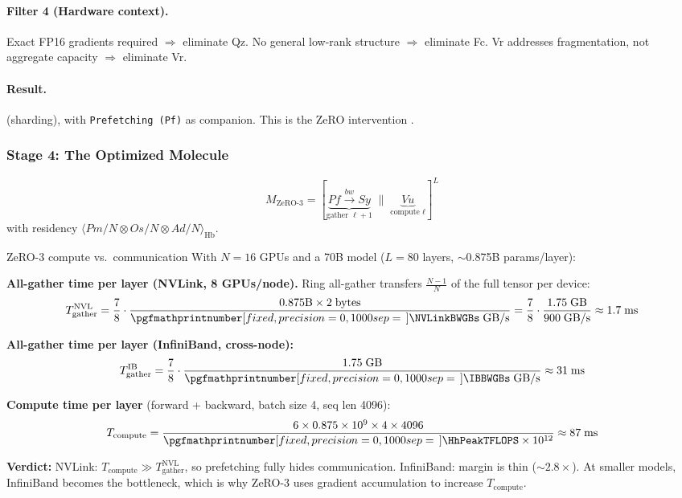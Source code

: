 \documentclass[10pt,twocolumn]{article}
\newcommand{\cvalint}[1]{\pgfmathprintnumber[fixed, precision=0, 1000 sep={\,}]{#1}}
\begin{document}
\paragraph{Filter 4 (Hardware context).} Exact FP16 gradients required $\Rightarrow$ eliminate Qz. No general low-rank structure $\Rightarrow$ eliminate Fc. Vr addresses fragmentation, not aggregate capacity $\Rightarrow$ eliminate Vr.

\paragraph{Result.}  (sharding), with \texttt{Prefetching (Pf)} as companion. This is the ZeRO intervention \citep{rajbhandari2020}.

\subsubsection{Stage 4: The Optimized Molecule}

\begin{equation*}
M_{\text{ZeRO-3}} = \left[\underbrace{Pf \xrightarrow{bw} Sy}_{\text{gather } \ell{+}1} \;\parallel\; \underbrace{Vu}_{\text{compute } \ell}\right]^{L}
\end{equation*}
with residency $\langle Pm/N \otimes Os/N \otimes Ad/N \rangle_{\text{Hb}}$.

\begin{napkinmath}{ZeRO-3 compute vs.\ communication}
With $N = 16$ GPUs and a 70B model ($L = 80$ layers, ${\sim}$0.875B params/layer):

\textbf{All-gather time per layer (NVLink, 8 GPUs/node).} Ring all-gather transfers $\frac{N-1}{N}$ of the full tensor per device:
\[
T_{\text{gather}}^{\text{NVL}} = \frac{7}{8} \cdot \frac{0.875\text{B} \times 2\;\text{bytes}}{\cvalint{\NVLinkBWGBs}\;\text{GB/s}} = \frac{7}{8} \cdot \frac{1.75\;\text{GB}}{900\;\text{GB/s}} \approx 1.7\;\text{ms}
\]

\textbf{All-gather time per layer (InfiniBand, cross-node):}
\[
T_{\text{gather}}^{\text{IB}} = \frac{7}{8} \cdot \frac{1.75\;\text{GB}}{\cvalint{\IBBWGBs}\;\text{GB/s}} \approx 31\;\text{ms}
\]

\textbf{Compute time per layer} (forward + backward, batch size 4, seq len 4096):
\[
T_{\text{compute}} = \frac{6 \times 0.875 \times 10^9 \times 4 \times 4096}{\cvalint{\HhPeakTFLOPS} \times 10^{12}} \approx 87\;\text{ms}
\]

\textbf{Verdict:} NVLink: $T_{\text{compute}} \gg T_{\text{gather}}^{\text{NVL}}$, so prefetching fully hides communication. InfiniBand: margin is thin ($\sim$$2.8\times$). At smaller models, InfiniBand becomes the bottleneck, which is why ZeRO-3 uses gradient accumulation to increase $T_{\text{compute}}$.
\end{napkinmath}
\end{document}
